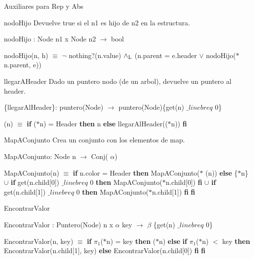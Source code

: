 \-Auxiliares para \-Rep y \-Abs

\begin{DoxyParagraph}{nodo\-Hijo}
\-Devuelve true si el n1 es hijo de n2 en la estructura.
\end{DoxyParagraph}
nodo\-Hijo \-: \-Node n1 x \-Node n2 $\to$ bool\par
 nodo\-Hijo(n, h) $\equiv$ $\lnot$ nothing?(n.\-value) $\land_{\rm L}$ (n.\-parent = e.\-header $\lor$ nodo\-Hijo($\ast$n.parent, e)) 

\begin{DoxyParagraph}{llegar\-A\-Header}
\-Dado un puntero nodo (de un arbol), devuelve un puntero al header.
\end{DoxyParagraph}
\{llegar\-Al\-Header\}\-: puntero(\-Node) $\to$ puntero(\-Node)\{get(n) $\_linebr eq$ 0\}\par
 (n) $\equiv$ {\bfseries if} ($\ast$n) = \-Header {\bfseries then} n {\bfseries else} llegar\-Al\-Header(($\ast$n)) {\bfseries fi} 

\begin{DoxyParagraph}{\-Map\-A\-Conjunto}
\-Crea un conjunto con los elementos de map.\par

\end{DoxyParagraph}
\-Map\-A\-Conjunto\-: \-Node n $\to$ \-Conj( $\alpha$)\par
 \-Map\-A\-Conjunto(n) $\equiv$ {\bfseries if} n.\-color = \-Header {\bfseries then} \-Map\-A\-Conjunto($\ast$ (n)) {\bfseries else} \{$\ast$n\} $\cup$ {\bfseries if} get(n.\-child\mbox{[}0\mbox{]}) $\_linebr eq$ 0 {\bfseries then} \-Map\-A\-Conjunto($\ast$n.child\mbox{[}0\mbox{]}) {\bfseries fi} $\cup$ {\bfseries if} get(n.\-child\mbox{[}1\mbox{]}) $\_linebr eq$ 0 {\bfseries then} \-Map\-A\-Conjunto($\ast$n.child\mbox{[}1\mbox{]}) {\bfseries fi} {\bfseries fi} 

\begin{DoxyParagraph}{\-Encontrar\-Valor}

\end{DoxyParagraph}
\-Encontrar\-Valor \-: \-Puntero(\-Node) n x $\alpha$ key $\to$ $\beta$ \{get(n) $\_linebr eq$ 0\}\par
 \-Encontrar\-Valor(n, key) $\equiv$ {\bfseries if} $\pi_1$($\ast$n) = key {\bfseries then} ($\ast$n) {\bfseries else} {\bfseries if} $\pi_1$($\ast$n) $<$ key {\bfseries then} \-Encontrar\-Valor(n.\-child\mbox{[}1\mbox{]}, key) {\bfseries else} \-Encontrar\-Valor(n.\-child\mbox{[}0\mbox{]}) {\bfseries fi} {\bfseries fi} 

